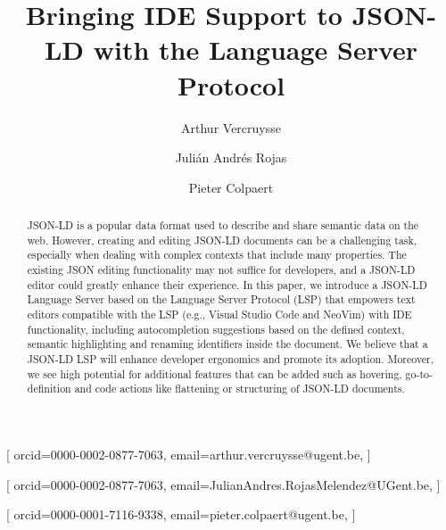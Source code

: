 \documentclass[
]{ceurart}
\begin{document}



\title{Bringing IDE Support to JSON-LD with the Language Server Protocol}


\author[1]{Arthur Vercruysse}[%
orcid=0000-0002-0877-7063,
email=arthur.vercruysse@ugent.be,
]
\author[1]{Julián Andrés Rojas}[%
orcid=0000-0002-0877-7063,
email=JulianAndres.RojasMelendez@UGent.be,
]
\author[1]{Pieter Colpaert}[%
orcid=0000-0001-7116-9338,
email=pieter.colpaert@ugent.be,
]
\cormark[1]
\fnmark[1]
\address[1]{IDLab, Department of Electronics and Information Systems, Ghent University – imec}


\begin{abstract}
  JSON-LD is a popular data format used to describe and share semantic data on the web.
  However, creating and editing JSON-LD documents can be a challenging task, especially when dealing with complex contexts that include many properties.
  The existing JSON editing functionality may not suffice for developers, and a JSON-LD editor could greatly enhance their experience.
  In this paper, we introduce a JSON-LD Language Server based on the Language Server Protocol (LSP) that empowers text editors compatible with the LSP (e.g., Visual Studio Code and NeoVim) with IDE functionality, including autocompletion suggestions based on the defined context, semantic highlighting and renaming identifiers inside the document.
  We believe that a JSON-LD LSP will enhance developer ergonomics and promote its adoption.
  Moreover, we see high potential for additional features that can be added such as hovering, go-to-definition and code actions like flattening or structuring of JSON-LD documents.
\end{abstract}
\end{document}
